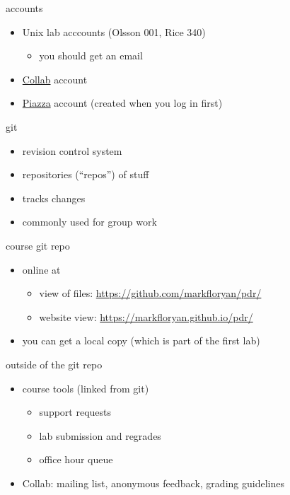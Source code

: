 \begin{frame}{accounts}
    \begin{itemize}
    \item Unix lab acccounts (Olsson 001, Rice 340)
        \begin{itemize}
        \item you should get an email
        \end{itemize}
    \item \href{https://collab.itc.virginia.edu}{Collab} account
    \item \href{https://piazza.com}{Piazza} account (created when you log in first)
    \end{itemize}
\end{frame}

\begin{frame}{git}
    \begin{itemize}
        \item revision control system
        \item repositories (``repos'') of stuff
        \item tracks changes
            \vspace{.5cm}
        \item commonly used for group work
    \end{itemize}
\end{frame}

\begin{frame}{course git repo}
    \begin{itemize}
        \item online at
            \begin{itemize}
            \item view of files: \url{https://github.com/markfloryan/pdr/}
            \item website view: \url{https://markfloryan.github.io/pdr/}
            \end{itemize}
        \item you can get a local copy (which is part of the first lab)
    \end{itemize}
\end{frame}

\begin{frame}{outside of the git repo}
    \begin{itemize}
        \item course tools (linked from git)
            \begin{itemize}
                \item support requests
                \item lab submission and regrades
                \item office hour queue
            \end{itemize}
        \item Collab: mailing list, anonymous feedback, grading guidelines
    \end{itemize}
\end{frame}

